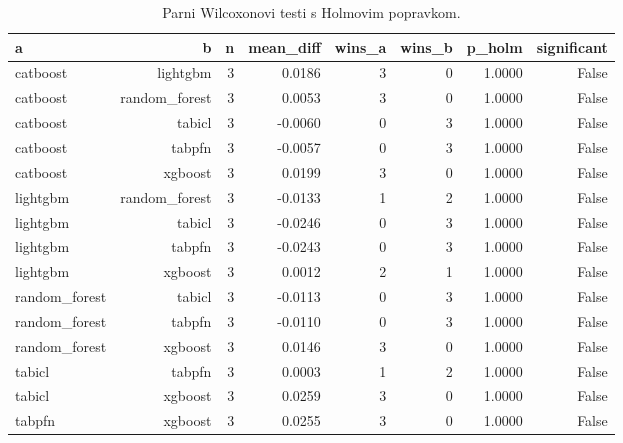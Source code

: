 \begin{table}[htbp]
\centering
\caption{Parni Wilcoxonovi testi s Holmovim popravkom.}
\label{tab:wilcoxon}
\begin{tabular}{lrrrrrrr}
\hline
a & b & n & mean\_diff & wins\_a & wins\_b & p\_holm & significant \\
\hline
catboost & lightgbm & 3 & 0.0186 & 3 & 0 & 1.0000 & False \\
catboost & random\_forest & 3 & 0.0053 & 3 & 0 & 1.0000 & False \\
catboost & tabicl & 3 & -0.0060 & 0 & 3 & 1.0000 & False \\
catboost & tabpfn & 3 & -0.0057 & 0 & 3 & 1.0000 & False \\
catboost & xgboost & 3 & 0.0199 & 3 & 0 & 1.0000 & False \\
lightgbm & random\_forest & 3 & -0.0133 & 1 & 2 & 1.0000 & False \\
lightgbm & tabicl & 3 & -0.0246 & 0 & 3 & 1.0000 & False \\
lightgbm & tabpfn & 3 & -0.0243 & 0 & 3 & 1.0000 & False \\
lightgbm & xgboost & 3 & 0.0012 & 2 & 1 & 1.0000 & False \\
random\_forest & tabicl & 3 & -0.0113 & 0 & 3 & 1.0000 & False \\
random\_forest & tabpfn & 3 & -0.0110 & 0 & 3 & 1.0000 & False \\
random\_forest & xgboost & 3 & 0.0146 & 3 & 0 & 1.0000 & False \\
tabicl & tabpfn & 3 & 0.0003 & 1 & 2 & 1.0000 & False \\
tabicl & xgboost & 3 & 0.0259 & 3 & 0 & 1.0000 & False \\
tabpfn & xgboost & 3 & 0.0255 & 3 & 0 & 1.0000 & False \\
\hline
\end{tabular}
\end{table}
